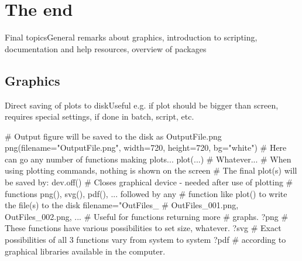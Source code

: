 \documentclass[compress, xelatex, 11pt, xcolor=svgnames, aspectratio=169, url={hyphens, lowtilde}]{beamer}
\begin{document}
\section{The end}

\begin{frame}{Final topics}{General remarks about graphics, introduction to scripting, documentation and help resources, overview of packages}
	\tableofcontents[currentsection, sectionstyle=show/hide, hideothersubsections]
\end{frame}

\subsection{Graphics}

\begin{frame}[fragile]{Direct saving of plots to disk}{Useful e.g. if plot should be bigger than screen, requires special settings, if done in batch, script, etc.}
	\begin{spluscode}
    # Output figure will be saved to the disk as OutputFile.png
    png(filename="OutputFile.png", width=720, height=720, bg="white")
    # Here can go any number of functions making plots...
    plot(...) # Whatever...
    # When using plotting commands, nothing is shown on the screen
    # The final plot(s) will be saved by:
    dev.off() # Closes graphical device - needed after use of plotting
              # functions png(), svg(), pdf(), ... followed by any
              # function like plot() to write the file(s) to the disk
    filename="OutFiles_%
                                 # OutFiles_001.png, OutFiles_002.png, ...
                                 # Useful for functions returning more
                                 # graphs.
    ?png # These functions have various possibilities to set size, whatever.
    ?svg # Exact possibilities of all 3 functions vary from system to system
    ?pdf # according to graphical libraries available in the computer.
	\end{spluscode}
\end{frame}
\end{document}
